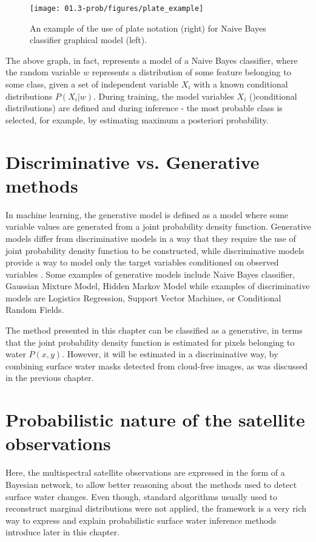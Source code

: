 \begin{figure}[H]
	\centering
	\texttt{[image: 01.3-prob/figures/plate\_example]}
	\caption{An example of the use of plate notation (right) for Naive Bayes classifier graphical model (left).}
	\label{fig:plate-example}
\end{figure}

The above graph, in fact, represents a model of a Naive Bayes classifier, where the random variable $w$ represents a distribution of some feature belonging to some class, given a set of independent variable $X_i$ with a known conditional distributions $P{(X_i|w)}$. During training, the model variables $X_i$ ()conditional distributions) are defined and during inference - the most probable class is selected, for example, by estimating maximum a posteriori probability.

\section{Discriminative vs. Generative methods}

In machine learning, the generative model is defined as a model where some variable values are generated from a joint probability density function. Generative models differ from discriminative models in a way that they require the use of joint probability density function to be constructed, while discriminative models provide a way to model only the target variables conditioned on observed variables \citep{ng2002discriminative}. Some examples of generative models include Naive Bayes classifier, Gaussian Mixture Model, Hidden Markov Model while examples of discriminative models are Logistics Regression, Support Vector Machines, or Conditional Random Fields. 

The method presented in this chapter can be classified as a generative, in terms that the joint probability density function is estimated for pixels belonging to water $P(x, y)$. However, it will be estimated in a discriminative way, by combining surface water masks detected from cloud-free images, as was discussed in the previous chapter.

\section{Probabilistic nature of the satellite observations}

Here, the multispectral satellite observations are expressed in the form of a Bayesian network, to allow better reasoning about the methods used to detect surface water changes. Even though, standard algorithms usually used to reconstruct marginal distributions were not applied, the framework is a very rich way to express and explain probabilistic surface water inference methods introduce later in this chapter.

